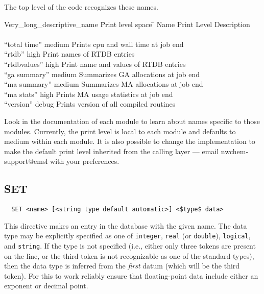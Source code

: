 The top level of the code recognizes these names. 
\begin{tabbing}
  Very\_long\_descriptive\_name \= Print level space \= \kill
  Name                   \> Print Level \> Description \\
                         \>        \> \\
 ``total time''        \> medium \> Prints cpu and wall time at job end\\
 ``rtdb''              \> high    \> Print names of RTDB entries\\
 ``rtdbvalues''        \> high    \> Print name and values of RTDB entries\\
 ``ga summary''        \> medium \> Summarizes GA allocations at job end \\
 ``ma summary''        \> medium \> Summarizes MA allocations at job end \\
 ``ma stats''          \> high   \> Prints MA usage statistics at job end \\
 ``version''           \> debug  \> Prints version of all compiled routines \\
\end{tabbing}

Look in the documentation of each module to learn about names specific
to those modules.  Currently, the print level is local to each module
and defaults to medium within each module.  It is also possible to
change the implementation to make the default print level inherited
from the calling layer --- email nwchem-support@emsl with your
preferences.

\subsection{SET}
\label{sec:set}

\begin{verbatim}
  SET <name> [<string type default automatic>] <$type$ data>
\end{verbatim}

This directive makes an entry in the database with the given name.
The data type may be explicitly specified as one of \verb+integer+,
\verb+real+ (or \verb+double+), \verb+logical+, and \verb+string+.  If
the type is not specified (i.e., either only three tokens are present
on the line, or the third token is not recognizable as one of the
standard types), then the data type is inferred from the {\em first}
datum (which will be the third token).  For this to work reliably
ensure that floating-point data include either an exponent or decimal
point.

